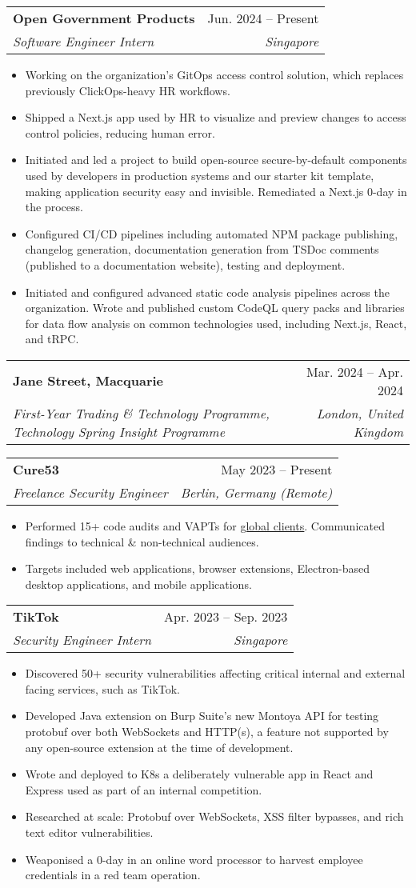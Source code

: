\documentclass[letterpaper,10pt]{article}
\makeatletter
\newcommand{\link}[2]{\href{#1}{\color{blue}\underline{#2}}}
\newcommand{\resumeItem}[1]{
  \item\small{
    {#1 \vspace{-2pt}}
  }
}
\newcommand{\resumeSubheading}[4]{
  \vspace{-2pt}\item
  \begin{tabular*}{0.97\textwidth}[t]{l@{\extracolsep{\fill}}r}
    \textbf{#1} & #2 \\
    \textit{\small#3} & \textit{\small #4} \\
  \end{tabular*}\vspace{-7pt}
}
\newcommand{\resumeItemListStart}{\begin{itemize}}
\newcommand{\resumeItemListEnd}{\end{itemize}\vspace{-5pt}}
\makeatother
\begin{document}
\resumeSubheading {Open Government Products}{Jun.
	2024 -- Present}
{Software Engineer Intern}{Singapore}
\resumeItemListStart
\resumeItem{Working on the organization's GitOps access control solution, which replaces previously ClickOps-heavy HR workflows.}
\resumeItem{Shipped a Next.js app used by HR to visualize and preview changes to access control policies, reducing human error.}
\resumeItem{Initiated and led a project to build open-source secure-by-default components used by developers in production systems and our starter kit template, making application
	security easy and invisible.
	Remediated a Next.js 0-day in the process.
}
\resumeItem{Configured CI/CD pipelines including automated NPM package publishing, changelog generation, documentation generation from TSDoc comments (published to a documentation website), testing and deployment.}
\resumeItem{Initiated and configured advanced static code analysis pipelines across the organization.
	Wrote and published custom CodeQL query packs and libraries for data flow analysis on common technologies used, including Next.js, React, and tRPC.
}
\resumeItemListEnd
\vspace{2pt}

\resumeSubheading
{Jane Street, Macquarie}{Mar. 2024 -- Apr. 2024}
{First-Year Trading \& Technology Programme, Technology Spring Insight Programme}
{London, United Kingdom}
\vspace{2pt}

\resumeSubheading
{Cure53}{May 2023 -- Present}
{Freelance Security Engineer}{Berlin, Germany (Remote)}
\resumeItemListStart
\resumeItem{Performed 15+ code audits and VAPTs for \link{https://cure53.de/\#publications}{global clients}.
	Communicated findings to technical \& non-technical audiences.
}
\resumeItem{Targets included web applications, browser extensions, Electron-based desktop applications, and mobile applications.}
\resumeItemListEnd
\vspace{2pt}

\resumeSubheading
{TikTok}{Apr. 2023 -- Sep. 2023}
{Security Engineer Intern}{Singapore}
\resumeItemListStart
\resumeItem{Discovered 50+ security vulnerabilities affecting critical internal and external facing services, such as TikTok.}
\resumeItem{Developed Java extension on Burp Suite's new Montoya API for testing protobuf over both WebSockets and HTTP(s), a feature not supported by any open-source extension at the time of development.}
\resumeItem{Wrote and deployed to K8s a deliberately vulnerable app in React and Express used as part of an internal competition.}
\resumeItem{Researched at scale: Protobuf over WebSockets, XSS filter bypasses, and rich text editor vulnerabilities.}
\resumeItem{Weaponised a 0-day in an online word processor to harvest employee credentials in a red team operation.}
\resumeItemListEnd
\end{document}
